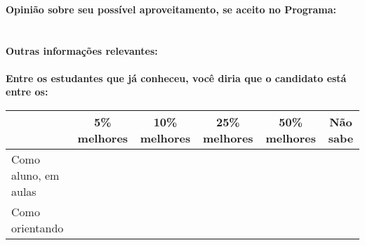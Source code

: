 \documentclass[11pt]{article}
\begin{document}
\\\\
\\
\textbf{Opinião sobre seu possível aproveitamento, se aceito no Programa:}
\\\\ 
\\
\textbf{Outras informações relevantes:} \\
\\[0.3cm]
\textbf{Entre os estudantes que já conheceu, você diria que o candidato está entre os:}
\\
\begin{tabular}{|l|c|c|c|c|c|}
\hline
 & 5\% melhores & 10\% melhores & 25\% melhores & 50\% melhores & Não sabe \\
\hline
Como aluno, em aulas &  &  &  &  & \\
\hline
Como orientando &  &  &  &  & \\
\hline
\end{tabular}
\end{document}
